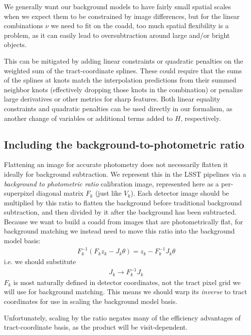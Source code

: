 \documentclass[DM,lsstdraft,authoryear,toc]{lsstdoc}
\begin{document}
We generally want our background models to have fairly small spatial scales when we expect them to be constrained by image differences, but for the linear combinations $\nu$ we need to fit on the coadd, too much spatial flexibility is a problem, as it can easily lead to oversubtraction around large and/or bright objects.

This can be mitigated by adding linear constraints or quadratic penalties on the weighted sum of the tract-coordinate splines.
These could require that the sums of the splines at knots match the interpolation predictions from their summed neighbor knots (effectively dropping those knots in the combination) or penalize large derivatives or other metrics for sharp features.
Both linear equality constraints and quadratic penalties can be used directly in our formalism, as another change of variables or additional terms added to $H$, respectively.

\subsection{Including the background-to-photometric ratio}

Flattening an image for accurate photometry does not necessarily flatten it ideally for background subtraction.
We represent this in the LSST pipelines via a \emph{background to photometric  ratio} calibration image, represented here as a per-superpixel diagonal matrix $F_k$ (just like $V_k$).
Each detector image should be multiplied by this ratio to flatten the background before traditional background subtraction, and then divided by it after the background has been subtracted.
Because we want to build a coadd from images that are photometrically flat, for background matching we instead need to move this ratio into the background model basis:
\begin{align}
	F_k^{-1}\left(F_k z_k - J_k \theta\right) = z_k - F_k^{-1} J_k \theta
\end{align}
i.e. we should substitute
\begin{align}
	J_k \to F_k^{-1} J_k
\end{align}
$F_k$ is most naturally defined in detector coordinates, not the tract pixel grid we will use for background matching.
This means we should warp its \emph{inverse} to tract coordinates for use in scaling the background model basis.

Unfortunately, scaling by the ratio negates many of the efficiency advantages of tract-coordinate basis, as the product will be visit-dependent.
\end{document}
